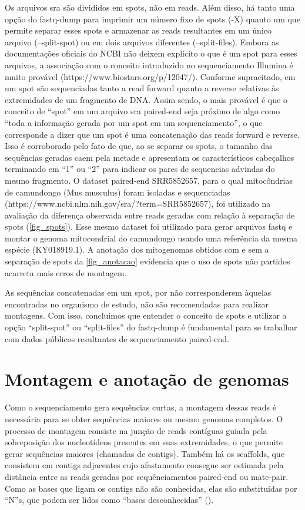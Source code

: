 \documentclass[../DISSERTACAO_MAIN.tex]{subfiles}
\begin{document}
Os arquivos sra são divididos em spots, não em reads. Além disso, há tanto uma opção do fastq-dump para imprimir um número fixo de spots (-X) quanto um que permite separar esses spots e armazenar as reads resultantes em um único arquivo (--split-spot) ou em dois arquivos diferentes (--split-files). Embora as documentações oficiais do NCBI não deixem explícito o que é um spot para esses arquivos, a associação com o conceito introduzido no sequenciamento Illumina é muito provável (https://www.biostars.org/p/12047/). Conforme supracitado, em um spot são sequenciadas tanto a read forward quanto a reverse relativas às extremidades de um fragmento de DNA. Assim sendo, o mais provável é que o conceito de “spot” em um arquivo sra paired-end  seja próximo de algo como “toda a informação gerada por um spot em um sequenciamento”, o que corresponde a dizer que um spot é uma concatenação das reads forward e reverse. Isso é corroborado pelo fato de que, ao se separar os spots, o tamanho das sequências geradas caem pela metade e apresentam os característicos cabeçalhos terminando em “1” ou “2” para indicar os pares de sequencias advindas do mesmo fragmento. O dataset paired-end SRR5852657, para o qual mitocôndrias de camundongo (Mus musculus) foram isoladas e sequenciadas (https://www.ncbi.nlm.nih.gov/sra/?term=SRR5852657), foi utilizado na avaliação da diferença observada entre reads geradas com relação à separação de spots (\autoref{fig_spots}). Esse mesmo dataset foi utilizado para gerar arquivos fastq e montar o genoma mitocondrial do camundongo usando uma referência da mesma espécie (KY018919.1). A anotação dos mitogenomas obtidos com e sem a separação de spots da \autoref{fig_anotacao} evidencia que o uso de spots não partidos acarreta mais erros de montagem. 

As sequências concatenadas em um spot, por não corresponderem àquelas encontradas no organismo de estudo, não são recomendadas para realizar montagens. Com isso, concluímos que entender o conceito de spots e utilizar a opção “split-spot” ou “split-files” do fastq-dump é fundamental para se trabalhar com dados públicos resultantes de sequenciamento paired-end.

\section{Montagem e anotação de genomas}

Como o sequenciamento gera sequências curtas, a montagem dessas reads é necessária para se obter sequências maiores ou mesmo genomas completos. O processo de montagem consiste na junção de reads contíguas guiada pela sobreposição dos nucleotídeos presentes em suas extremidades, o que permite gerar sequências maiores (chamadas de contigs). Também há os scaffolds, que consistem em contigs adjacentes cujo afastamento consegue ser estimada pela distância entre as reads geradas por sequênciamentos paired-end ou mate-pair. Como as bases que ligam os contigs não são conhecidas, elas são substituídas por “N”s, que podem ser lidos como “bases desconhecidas” ().
\end{document}
